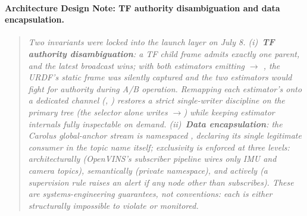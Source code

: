 \paragraph{Architecture Design Note: TF authority disambiguation and data
encapsulation.}
\begin{quote}\itshape
Two invariants were locked into the launch layer on July 8. (i)~\textbf{TF
authority disambiguation}: a TF child frame admits exactly one parent, and the
latest broadcast wins; with both estimators emitting $\to$%
, the URDF's static  frame was silently captured and the
two estimators would fight for authority during A/B operation. Remapping each
estimator's  onto a dedicated channel (,
) restores a strict single-writer discipline on the primary
tree (the selector alone writes $\to$) while
keeping estimator internals fully inspectable on demand. (ii)~\textbf{Data
encapsulation}: the Carolus global-anchor stream is namespaced
, declaring its single legitimate consumer
in the topic name itself; exclusivity is enforced at three levels:
architecturally (OpenVINS's subscriber pipeline wires only IMU and camera
topics), semantically (private namespace), and actively (a supervision rule
raises an alert if any node other than  subscribes).
These are systems-engineering guarantees, not conventions: each is either
structurally impossible to violate or monitored.
\end{quote}

